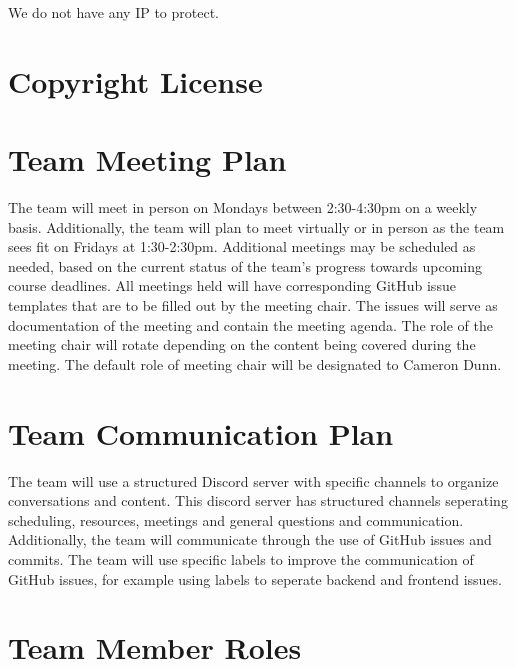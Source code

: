 \documentclass{article}
\begin{document}
We do not have any IP to protect.

\section{Copyright License}



\section{Team Meeting Plan}

The team will meet in person on Mondays between 2:30-4:30pm on a weekly basis. 
Additionally, the team will plan to meet virtually or in person as the team sees fit on Fridays at 1:30-2:30pm.
Additional meetings may be scheduled as needed, based on the current status of the team's progress towards upcoming course deadlines. 
All meetings held will have corresponding GitHub issue templates that are to be filled out by the meeting chair. The issues will serve as documentation of the meeting and contain the meeting agenda.
The role of the meeting chair will rotate depending on the content being covered during the meeting. 
The default role of meeting chair will be designated to Cameron Dunn. 



\section{Team Communication Plan}

The team will use a structured Discord server with specific channels to organize conversations and content. 
This discord server has structured channels seperating scheduling, resources, meetings and general questions and communication. 
Additionally, the team will communicate through the use of GitHub issues and commits. 
The team will use specific labels to improve the communication of GitHub issues, for example using labels to seperate backend and frontend issues. 

\section{Team Member Roles}
\end{document}
